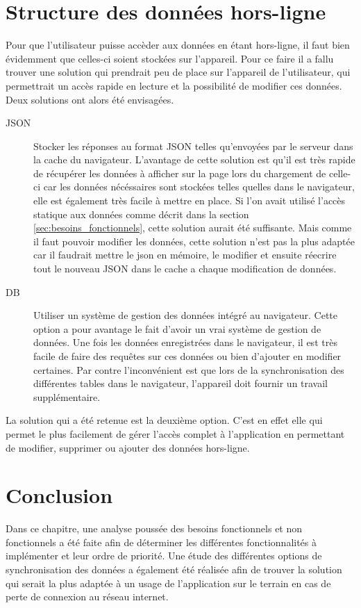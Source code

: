 \documentclass{EPL-master-thesis-covers-FR}
\begin{document}
		\section{Structure des données hors-ligne}
			\label{sec:data}
			Pour que l'utilisateur puisse accèder aux données en étant hors-ligne, il faut bien évidemment que celles-ci soient stockées sur l'appareil. Pour ce faire il a fallu trouver une solution qui prendrait peu de place sur l'appareil de l'utilisateur, qui permettrait un accès rapide en lecture et la possibilité de modifier ces données. Deux solutions ont alors été envisagées.
			\begin{description}
				\item[JSON] Stocker les réponses au format JSON telles qu'envoyées par le serveur dans la cache du navigateur. L'avantage de cette solution est qu'il est très rapide de récupérer les données à afficher sur la page lors du chargement de celle-ci car les données nécéssaires sont stockées telles quelles dans le navigateur, elle est également très facile à mettre en place. Si l'on avait utilisé l'accès statique aux données comme décrit dans la section \ref{sec:besoins_fonctionnels}, cette solution aurait été suffisante. Mais comme il faut pouvoir modifier les données, cette solution n'est pas la plus adaptée car il faudrait mettre le json en mémoire, le modifier et ensuite réecrire tout le nouveau JSON dans le cache a chaque modification de données.
				\item[DB] Utiliser un système de gestion des données intégré au navigateur. Cette option a pour avantage le fait d'avoir un vrai système de gestion de données. Une fois les données enregistrées dans le navigateur, il est très facile de faire des requêtes sur ces données ou bien d'ajouter en modifier certaines. Par contre l'inconvénient est que lors de la synchronisation des différentes tables dans le navigateur, l'appareil doit fournir un travail supplémentaire.
			\end{description}
				
			La solution qui a été retenue est la deuxième option. C'est en effet elle qui permet le plus facilement de gérer l'accès complet à l'application en permettant de modifier, supprimer ou ajouter des données hors-ligne.
			
			
		\section{Conclusion}
			Dans ce chapitre, une analyse poussée des besoins fonctionnels et non fonctionnels a été faite afin de déterminer les différentes fonctionnalités à implémenter et leur ordre de priorité. Une étude des différentes options de synchronisation des données a également été réalisée afin de trouver la solution qui serait la plus adaptée à un usage de l'application sur le terrain en cas de perte de connexion au réseau internet.
			
\end{document}
